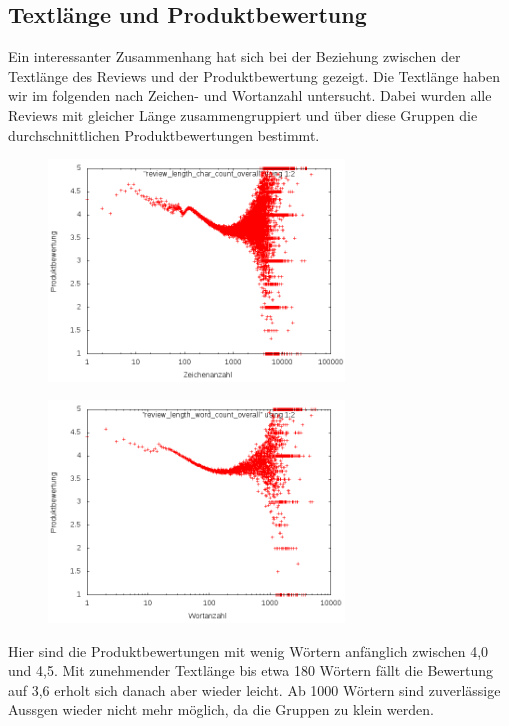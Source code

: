 \documentclass{scrartcl}
\theoremstyle{my_th_style}
\begin{document}
\subsection{Textlänge und Produktbewertung}
Ein interessanter Zusammenhang hat sich bei der Beziehung zwischen der Textlänge des Reviews und der Produktbewertung gezeigt. Die Textlänge haben wir im folgenden nach Zeichen- und  Wortanzahl untersucht. Dabei wurden alle Reviews mit gleicher Länge zusammengruppiert und über diese Gruppen die durchschnittlichen Produktbewertungen bestimmt. 
\begin{figure}[H]
\centering
    \includegraphics[width=0.7\textwidth]{_results/char_rating.png}
\end{figure}
\begin{figure}[H]
\centering
    \includegraphics[width=0.7\textwidth]{_results/word_rating.png}

\end{figure}
Hier sind die Produktbewertungen mit wenig Wörtern anfänglich zwischen 4,0 und 4,5. Mit zunehmender Textlänge bis etwa 180 Wörtern fällt die Bewertung auf 3,6 erholt sich danach aber wieder leicht. Ab 1000 Wörtern sind zuverlässige Aussgen wieder nicht mehr möglich, da die Gruppen zu klein werden.
\end{document}
